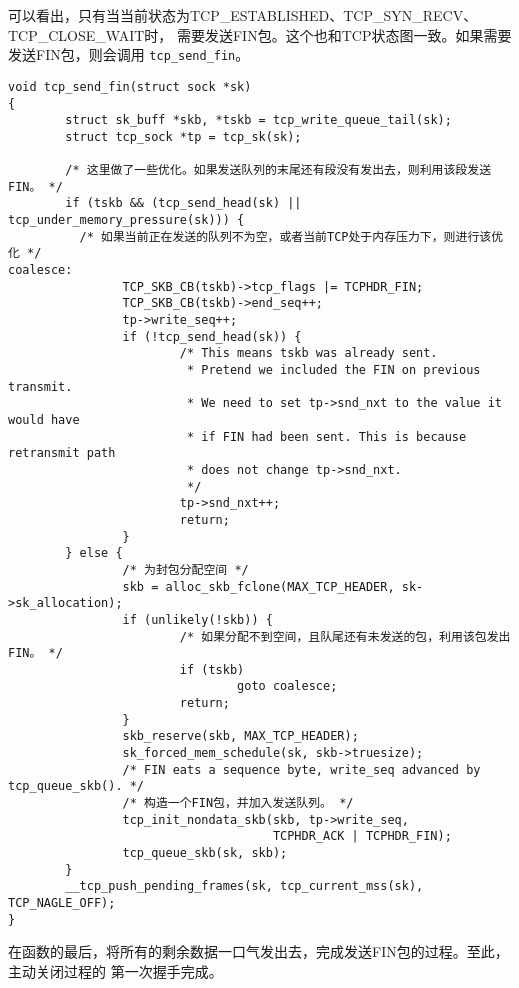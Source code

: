 可以看出，只有当当前状态为TCP\_ESTABLISHED、TCP\_SYN\_RECV、TCP\_CLOSE\_WAIT时，
需要发送FIN包。这个也和TCP状态图一致。如果需要发送FIN包，则会调用
\texttt{tcp_send_fin}。
\begin{verbatim}
void tcp_send_fin(struct sock *sk)
{
        struct sk_buff *skb, *tskb = tcp_write_queue_tail(sk);
        struct tcp_sock *tp = tcp_sk(sk);

        /* 这里做了一些优化。如果发送队列的末尾还有段没有发出去，则利用该段发送FIN。 */
        if (tskb && (tcp_send_head(sk) || tcp_under_memory_pressure(sk))) {
          /* 如果当前正在发送的队列不为空，或者当前TCP处于内存压力下，则进行该优化 */
coalesce:
                TCP_SKB_CB(tskb)->tcp_flags |= TCPHDR_FIN;
                TCP_SKB_CB(tskb)->end_seq++;
                tp->write_seq++;
                if (!tcp_send_head(sk)) {
                        /* This means tskb was already sent.
                         * Pretend we included the FIN on previous transmit.
                         * We need to set tp->snd_nxt to the value it would have
                         * if FIN had been sent. This is because retransmit path
                         * does not change tp->snd_nxt.
                         */
                        tp->snd_nxt++;
                        return;
                }
        } else {
                /* 为封包分配空间 */
                skb = alloc_skb_fclone(MAX_TCP_HEADER, sk->sk_allocation);
                if (unlikely(!skb)) {
                        /* 如果分配不到空间，且队尾还有未发送的包，利用该包发出FIN。 */
                        if (tskb)
                                goto coalesce;
                        return;
                }
                skb_reserve(skb, MAX_TCP_HEADER);
                sk_forced_mem_schedule(sk, skb->truesize);
                /* FIN eats a sequence byte, write_seq advanced by tcp_queue_skb(). */
                /* 构造一个FIN包，并加入发送队列。 */
                tcp_init_nondata_skb(skb, tp->write_seq,
                                     TCPHDR_ACK | TCPHDR_FIN);
                tcp_queue_skb(sk, skb);
        }
        __tcp_push_pending_frames(sk, tcp_current_mss(sk), TCP_NAGLE_OFF);
}
\end{verbatim}
在函数的最后，将所有的剩余数据一口气发出去，完成发送FIN包的过程。至此，主动关闭过程的
第一次握手完成。

